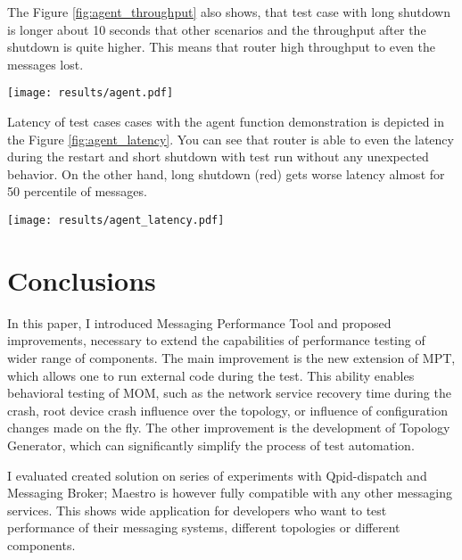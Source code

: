 \documentclass{ExcelAtFIT}
\begin{document}
The Figure \ref{fig:agent_throughput} also shows, that test case with long shutdown is longer about 10 seconds that other scenarios and the throughput after the shutdown is quite higher. This means that router high throughput to even the messages lost.

\begin{figure*}[h!t]
	\centering
	\texttt{[image: results/agent.pdf]}
	\caption{Router throughput comparison during the same load after different unexpected events.}
	\label{fig:agent_throughput}
\end{figure*}

Latency of test cases cases with the agent function demonstration is depicted in the Figure \ref{fig:agent_latency}. You can see that router is able to even the latency during the restart and short shutdown with test run without any unexpected behavior. On the other hand, long shutdown (red) gets worse latency almost for 50 percentile of messages.

\begin{figure*}[h!t]
	\centering
	\texttt{[image: results/agent\_latency.pdf]}
	\caption{Router and broker latency comparison during the same load.}
	\label{fig:agent_latency}
\end{figure*}


\section{Conclusions}
\label{sec:Conclusions}

In this paper, I introduced Messaging Performance Tool and proposed improvements, necessary to extend the capabilities of performance testing of wider range of components. The main improvement is the new extension of MPT, which allows one to run external code during the test. This ability enables behavioral testing of MOM, such as the network service recovery time during the crash, root device crash influence over the topology, or influence of configuration changes made on the fly. The other improvement is the development of Topology Generator, which can significantly simplify the process of test automation.

I evaluated created solution on series of experiments with Qpid-dispatch and Messaging Broker; Maestro is however fully compatible with any other messaging services. This shows wide application for developers who want to test performance of their messaging systems, different topologies or different components.
\end{document}
